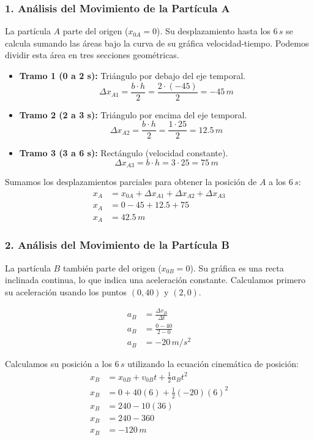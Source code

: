 \documentclass[12pt, a4paper]{article}
\begin{document}
\subsubsection*{1. Análisis del Movimiento de la Partícula A}
La partícula $A$ parte del origen ($x_{0A} = 0$). Su desplazamiento hasta los $6 \, \si{s}$ se calcula sumando las áreas bajo la curva de su gráfica velocidad-tiempo. Podemos dividir esta área en tres secciones geométricas.

\begin{itemize}
    \item \textbf{Tramo 1 (0 a 2 s):} Triángulo por debajo del eje temporal.
    $$ \Delta x_{A1} = \frac{b \cdot h}{2} = \frac{2 \cdot (-45)}{2} = -45 \, \si{m} $$
    \item \textbf{Tramo 2 (2 a 3 s):} Triángulo por encima del eje temporal.
    $$ \Delta x_{A2} = \frac{b \cdot h}{2} = \frac{1 \cdot 25}{2} = 12.5 \, \si{m} $$
    \item \textbf{Tramo 3 (3 a 6 s):} Rectángulo (velocidad constante).
    $$ \Delta x_{A3} = b \cdot h = 3 \cdot 25 = 75 \, \si{m} $$
\end{itemize}

Sumamos los desplazamientos parciales para obtener la posición de $A$ a los $6 \, \si{s}$:
\begin{align*}
x_A &= x_{0A} + \Delta x_{A1} + \Delta x_{A2} + \Delta x_{A3} \\
x_A &= 0 - 45 + 12.5 + 75 \\
x_A &= 42.5 \, \si{m}
\end{align*}

\subsubsection*{2. Análisis del Movimiento de la Partícula B}
La partícula $B$ también parte del origen ($x_{0B} = 0$). Su gráfica es una recta inclinada continua, lo que indica una aceleración constante. Calculamos primero su aceleración usando los puntos $(0, 40)$ y $(2, 0)$.

\begin{align*}
a_B &= \frac{\Delta v_B}{\Delta t} \\
a_B &= \frac{0 - 40}{2 - 0} \\
a_B &= -20 \, \si{m/s^2}
\end{align*}

Calculamos su posición a los $6 \, \si{s}$ utilizando la ecuación cinemática de posición:
\begin{align*}
x_B &= x_{0B} + v_{0B}t + \frac{1}{2}a_Bt^2 \\
x_B &= 0 + 40(6) + \frac{1}{2}(-20)(6)^2 \\
x_B &= 240 - 10(36) \\
x_B &= 240 - 360 \\
x_B &= -120 \, \si{m}
\end{align*}
\end{document}
